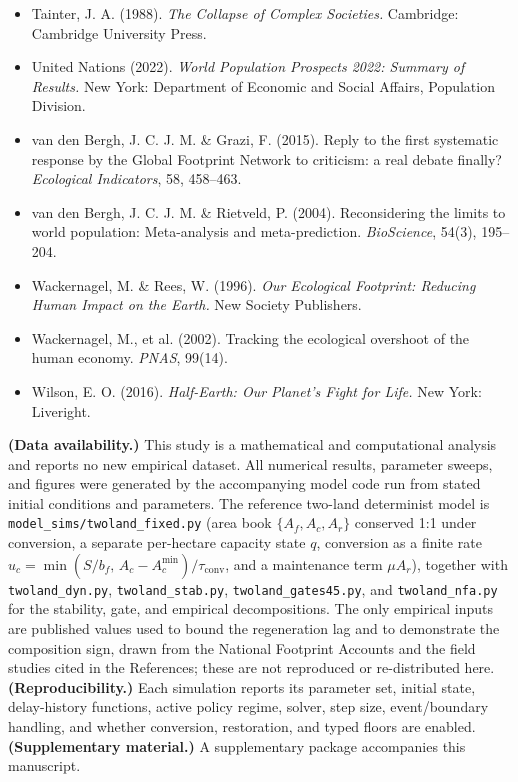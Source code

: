 \documentclass[11pt]{article}
\begin{document}
\begin{itemize}
\item Tainter, J. A. (1988). \emph{The Collapse of Complex Societies.} Cambridge: Cambridge University Press.
\item United Nations (2022). \emph{World Population Prospects 2022: Summary of Results.} New York: Department of Economic and Social Affairs, Population Division.
\item van den Bergh, J. C. J. M. \& Grazi, F. (2015). Reply to the first systematic response by the Global Footprint Network to criticism: a real debate finally? \emph{Ecological Indicators}, 58, 458--463.
\item van den Bergh, J. C. J. M. \& Rietveld, P. (2004). Reconsidering the limits to world population: Meta-analysis and meta-prediction. \emph{BioScience}, 54(3), 195--204.
\item Wackernagel, M. \& Rees, W. (1996). \emph{Our Ecological Footprint: Reducing Human Impact on the Earth.} New Society Publishers.
\item Wackernagel, M., et al. (2002). Tracking the ecological overshoot of the human economy. \emph{PNAS}, 99(14).
\item Wilson, E. O. (2016). \emph{Half-Earth: Our Planet's Fight for Life.} New York: Liveright.
\end{itemize}

\noindent\textbf{(Data availability.)} This study is a mathematical and computational analysis and reports no new empirical dataset. All numerical results, parameter sweeps, and figures were generated by the accompanying model code run from stated initial conditions and parameters. The reference two-land determinist model is \texttt{model\_sims/twoland\_fixed.py} (area book $\{A_f,A_c,A_r\}$ conserved 1:1 under conversion, a separate per-hectare capacity state $q$, conversion as a finite rate $u_c=\min(S/b_f,\,A_c-A_c^{\min})/\tau_{\mathrm{conv}}$, and a maintenance term $\mu A_r$), together with \texttt{twoland\_dyn.py}, \texttt{twoland\_stab.py}, \texttt{twoland\_gates45.py}, and \texttt{twoland\_nfa.py} for the stability, gate, and empirical decompositions. The only empirical inputs are published values used to bound the regeneration lag and to demonstrate the composition sign, drawn from the National Footprint Accounts and the field studies cited in the References; these are not reproduced or re-distributed here. \textbf{(Reproducibility.)} Each simulation reports its parameter set, initial state, delay-history functions, active policy regime, solver, step size, event/boundary handling, and whether conversion, restoration, and typed floors are enabled. \textbf{(Supplementary material.)} A supplementary package accompanies this manuscript.
\end{document}
